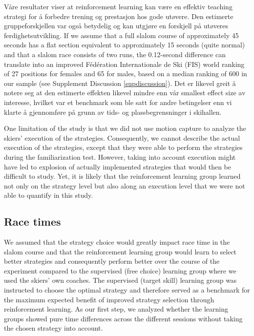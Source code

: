 Våre resultater viser at reinforcement learning kan være en effektiv teaching strategi for å forbedre trening og prestasjon hos gode utøvere. Den estimerte gruppeforskjellen var også betydelig og kan utgjøre en forskjell på utøveres ferdighetsutvikling. If we assume that a full slalom course of approximately 45 seconds has a flat section equivalent to approximately 15 seconds (quite normal) and that a slalom race consists of two runs, the 0.12-second difference can translate into an improved Fédération Internationale de Ski (FIS) world ranking of 27 positions for females and 65 for males, based on a median ranking of 600 in our sample (see Supplement Discussion \ref{supdiscussion}). Det er likevel greit å notere seg at den estimerte effekten likevel mindre enn vår smallest effect size av interesse, hvilket var et benchmark som ble satt for andre betingelser enn vi klarte å gjennomføre på grunn av tids- og plassbegrensninger i skihallen. 

One limitation of the study is that we did not use motion capture to analyze the skiers' execution of the strategies. Consequently, we cannot describe the actual execution of the strategies, except that they were able to perform the strategies during the familiarization test. However, taking into account execution might have led to explosion of actually implemented strategies that would then be difficult to study. Yet, it is likely that the reinforcement learning group learned not only on the strategy level but also along an execution level that we were not able to quantify in this study.









\subsection{Race times}\label{result_racetime}
We assumed that the strategy choice would greatly impact race time in the slalom course and that the reinforcement learning group would learn to select better strategies and consequently perform better over the course of the experiment compared to the supervised (free choice) learning group where we used the skiers' own coaches. The supervised (target skill) learning group was instructed to choose the optimal strategy and therefore served as a benchmark for the maximum expected benefit of improved strategy selection through reinforcement learning. As our first step, we analyzed whether the learning groups showed pure time differences across the different sessions without taking the chosen strategy into account. 

